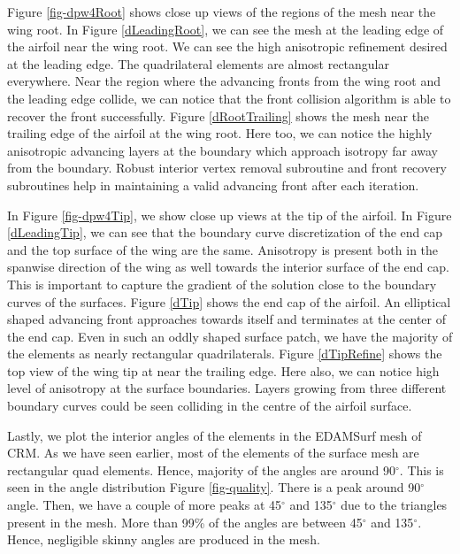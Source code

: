 Figure \ref{fig-dpw4Root} shows close up views of the regions of the mesh near the wing root. In Figure \ref{dLeadingRoot}, we can see the mesh at the leading edge of the airfoil near the wing root. We can see the high anisotropic refinement desired at the leading edge. The quadrilateral elements are almost rectangular everywhere. Near the region where the advancing fronts from the wing root and the leading edge collide, we can notice that the front collision algorithm is able to recover the front successfully. Figure \ref{dRootTrailing} shows the mesh near the trailing edge of the airfoil at the wing root. Here too, we can notice the highly anisotropic advancing layers at the boundary which approach isotropy far away from the boundary. Robust interior vertex removal subroutine and front recovery subroutines help in maintaining a valid advancing front after each iteration.

In Figure \ref{fig-dpw4Tip}, we show close up views at the tip of the airfoil. In Figure \ref{dLeadingTip}, we can see that the boundary curve discretization of the end cap and the top surface of the wing are the same. Anisotropy is present both in the spanwise direction of the wing as well towards the interior surface of the end cap. This is important to capture the gradient of the solution close to the boundary curves of the surfaces. Figure \ref{dTip} shows the end cap of the airfoil. An elliptical shaped advancing front approaches towards itself and terminates at the center of the end cap. Even in such an oddly shaped surface patch, we have the majority of the elements as nearly rectangular quadrilaterals. Figure \ref{dTipRefine} shows the top view of the wing tip at near the trailing edge. Here also, we can notice high level of anisotropy at the surface boundaries. Layers growing from three different boundary curves could be seen colliding in the centre of the airfoil surface. 

Lastly, we plot the interior angles of the elements in the EDAMSurf mesh of CRM. As we have seen earlier, most of the elements of the surface mesh are rectangular quad elements. Hence, majority of the angles are around 90$^\circ$. This is seen in the angle distribution Figure \ref{fig-quality}. There is a peak around 90$^\circ$ angle. Then, we have a couple of more peaks at 45$^\circ$ and 135$^\circ$ due to the triangles present in the mesh. More than 99\% of the angles are between 45$^\circ$ and 135$^\circ$. Hence, negligible skinny angles are produced in the mesh.

